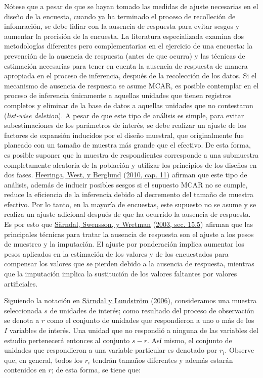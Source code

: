 \documentclass[
  12pt,
  spanish,
]{book}
\begin{document}
Nótese que a pesar de que se hayan tomado las medidas de ajuste necesarias en el diseño de la encuesta, cuando ya ha terminado el proceso de recolleción de infomración, se debe lidiar con la ausencia de respuesta para evitar sesgos y aumentar la precisión de la encuesta. La literatura especializada examina dos metodologías diferentes pero complementarias en el ejercicio de una encuesta: la prevención de la ausencia de respuesta (antes de que ocurra) y las técnicas de estimación necesarias para tener en cuenta la ausencia de respuesta de manera apropiada en el proceso de inferencia, después de la recolección de los datos. Si el mecanismo de ausencia de respuesta se asume MCAR, es posible contemplar en el proceso de inferencia únicamente a aquellas unidades que tienen registros completos y eliminar de la base de datos a aquellas unidades que no contestaron (\emph{list-wise deletion}). A pesar de que este tipo de análisis es simple, para evitar subestimaciones de los parámetros de interés, se debe realizar un ajuste de los factores de expansión inducidos por el diseño muestral, que originalmente fue planeado con un tamaño de muestra más grande que el efectivo. De esta forma, es posible suponer que la muestra de respondientes corresponde a una submuestra completamente aleatoria de la población y utilizar los principios de los diseños en dos fases. \protect\hyperlink{ref-Heeringa_West_Berglund_2010}{Heeringa, West, y Berglund} (\protect\hyperlink{ref-Heeringa_West_Berglund_2010}{2010, cap. 11}) afirman que este tipo de análisis, además de inducir posibles sesgos si el supuesto MCAR no se cumple, reduce la eficiencia de la inferencia debido al decremento del tamaño de muestra efectivo. Por lo tanto, en la mayoría de encuestas, este supuesto no se asume y se realiza un ajuste adicional después de que ha ocurrido la ausencia de respuesta. Es por esto que \protect\hyperlink{ref-Sarndal_Swensson_Wretman_2003}{Särndal, Swensson, y Wretman} (\protect\hyperlink{ref-Sarndal_Swensson_Wretman_2003}{2003, sec. 15.5}) afirman que las principales técnicas para tratar la ausencia de respuesta son el ajuste a los pesos de muestreo y la imputación. El ajuste por ponderación implica aumentar los pesos aplicados en la estimación de los valores y de los encuestados para compensar los valores que se pierden debido a la ausencia de respuesta, mientras que la imputación implica la sustitución de los valores faltantes por valores artificiales.

Siguiendo la notación en \protect\hyperlink{ref-Sarndal_Lundstrom_2006}{Särndal y Lundström} (\protect\hyperlink{ref-Sarndal_Lundstrom_2006}{2006}), consideramos una muestra seleccionada \(s\) de unidades de interés; como resultado del proceso de observación se denota a \(r\) como el conjunto de unidades que respondieron a uno o más de los \(I\) variables de interés. Una unidad que no respondió a ninguna de las variables del estudio pertenecerá entonces al conjunto \(s−r\). Así mismo, el conjunto de unidades que respondieron a una variable particular es denotado por \(r_i\). Observe que, en general, todos los \(r_i\) tendrán tamaños diferentes y además estarán contenidos en \(r\); de esta forma, se tiene que:
\end{document}
